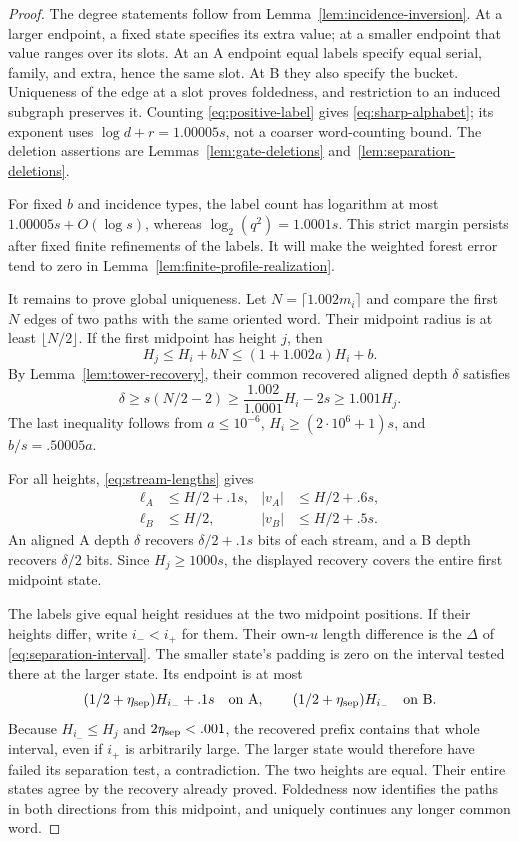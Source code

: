 \begin{proof}
The degree statements follow from
Lemma~\ref{lem:incidence-inversion}.  At a larger endpoint, a fixed
state specifies its extra value; at a smaller endpoint that value
ranges over its slots.  At an A endpoint equal labels specify equal
serial, family, and extra, hence the same slot.  At B they also specify
the bucket.  Uniqueness of the edge at a slot proves foldedness, and
restriction to an induced subgraph preserves it.  Counting
\eqref{eq:positive-label} gives \eqref{eq:sharp-alphabet}; its exponent
uses $\log d+r=1.00005s$, not a coarser word-counting bound.
The deletion assertions are
Lemmas~\ref{lem:gate-deletions} and~\ref{lem:separation-deletions}.

For fixed $b$ and incidence types, the label count has logarithm at most
$1.00005s+O(\log s)$, whereas $\log_2(q^2)=1.0001s$.
This strict margin persists after fixed finite refinements of the labels.
It will make the weighted forest error tend to zero in
Lemma~\ref{lem:finite-profile-realization}.

It remains to prove global uniqueness.  Let
$N=\lceil1.002m_i\rceil$ and compare the first $N$ edges of two paths
with the same oriented word.  Their midpoint radius is at least
$\lfloor N/2\rfloor$.  If the first midpoint has height $j$, then
\[
 H_j\le H_i+bN\le(1+1.002a)H_i+b.
\]
By Lemma~\ref{lem:tower-recovery}, their common recovered aligned depth
$\delta$ satisfies
\[
 \delta\ge s(N/2-2)
 \ge\frac{1.002}{1.0001}H_i-2s
 \ge1.001H_j.
\]
The last inequality follows from $a\le10^{-6}$,
$H_i\ge(2\cdot10^6+1)s$, and $b/s=.50005a$.

For all heights, \eqref{eq:stream-lengths} gives
\begin{align*}
 \ell_A&\le H/2+.1s,& |v_A|&\le H/2+.6s,\\
 \ell_B&\le H/2,& |v_B|&\le H/2+.5s.
\end{align*}
An aligned A depth $\delta$ recovers $\delta/2+.1s$ bits of each
stream, and a B depth recovers $\delta/2$ bits.  Since $H_j\ge1000s$,
the displayed recovery covers the entire first midpoint state.

The labels give equal height residues at the two midpoint positions.
If their heights differ, write $i_-<i_+$ for them.  Their own-$u$
length difference is the $\Delta$ of
\eqref{eq:separation-interval}.  The smaller state's padding is zero
on the interval tested there at the larger state.  Its endpoint is at
most
\[
 (1/2+\eta_{\rm sep})H_{i_-}+.1s\quad\text{on A},\qquad
 (1/2+\eta_{\rm sep})H_{i_-}\quad\text{on B}.
\]
Because $H_{i_-}\le H_j$ and $2\eta_{\rm sep}<.001$, the recovered prefix
contains that whole interval, even if $i_+$ is arbitrarily large.
The larger state would therefore have failed its separation test,
a contradiction.  The two heights are equal.  Their entire states
agree by the recovery already proved.  Foldedness now identifies the
paths in both directions from this midpoint, and uniquely continues
any longer common word.
\end{proof}

